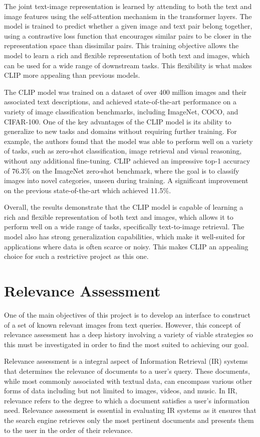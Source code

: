 \documentclass{l4proj}
\begin{document}
The joint text-image representation is learned by attending to both the text and image features using the self-attention mechanism in the transformer layers. The model is trained to predict whether a given image and text pair belong together, using a contrastive loss function that encourages similar pairs to be closer in the representation space than dissimilar pairs. This training objective allows the model to learn a rich and flexible representation of both text and images, which can be used for a wide range of downstream tasks. This flexibility is what makes CLIP more appealing than previous models.

The CLIP model was trained on a dataset of over 400 million images and their associated text descriptions, and achieved state-of-the-art performance on a variety of image classification benchmarks, including ImageNet, COCO, and CIFAR-100. One of the key advantages of the CLIP model is its ability to generalize to new tasks and domains without requiring further training. For example, the authors found that the model was able to perform well on a variety of tasks, such as zero-shot classification, image retrieval and visual reasoning, without any additional fine-tuning. CLIP achieved an impressive top-1 accuracy of 76.3\% on the ImageNet zero-shot benchmark, where the goal is to classify images into novel categories, unseen during training. A significant improvement on the previous state-of-the-art which achieved 11.5\%.

Overall, the results demonstrate that the CLIP model is capable of learning a rich and flexible representation of both text and images, which allows it to perform well on a wide range of tasks, specifically text-to-image retrieval. The model also has strong generalization capabilities, which make it well-suited for applications where data is often scarce or noisy. This makes CLIP an appealing choice for such a restrictive project as this one.


\section{Relevance Assessment}
One of the main objectives of this project is to develop an interface to construct of a set of known relevant images from text queries. However, this concept of relevance assessment has a deep history involving a variety of viable strategies so this must be investigated in order to find the most suited to achieving our goal.

Relevance assessment is a integral aspect of Information Retrieval (IR) systems that determines the relevance of documents to a user's query. These documents, while most commonly associated with textual data, can encompass various other forms of data including but not limited to images, videos, and music. In IR, relevance refers to the degree to which a document satisfies a user's information need. Relevance assessment is essential in evaluating IR systems as it ensures that the search engine retrieves only the most pertinent documents and presents them to the user in the order of their relevance. 
\end{document}

